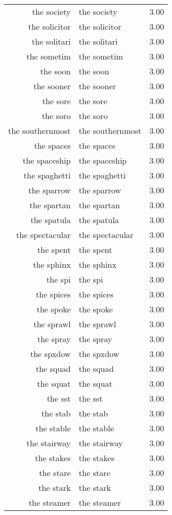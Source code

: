 \begin{table}[ht]
\begin{tabular}{rlr}
  the society & the society & 3.00 \\ 
  the solicitor & the solicitor & 3.00 \\ 
  the solitari & the solitari & 3.00 \\ 
  the sometim & the sometim & 3.00 \\ 
  the soon & the soon & 3.00 \\ 
  the sooner & the sooner & 3.00 \\ 
  the sore & the sore & 3.00 \\ 
  the soro & the soro & 3.00 \\ 
  the southernmost & the southernmost & 3.00 \\ 
  the spaces & the spaces & 3.00 \\ 
  the spaceship & the spaceship & 3.00 \\ 
  the spaghetti & the spaghetti & 3.00 \\ 
  the sparrow & the sparrow & 3.00 \\ 
  the spartan & the spartan & 3.00 \\ 
  the spatula & the spatula & 3.00 \\ 
  the spectacular & the spectacular & 3.00 \\ 
  the spent & the spent & 3.00 \\ 
  the sphinx & the sphinx & 3.00 \\ 
  the spi & the spi & 3.00 \\ 
  the spices & the spices & 3.00 \\ 
  the spoke & the spoke & 3.00 \\ 
  the sprawl & the sprawl & 3.00 \\ 
  the spray & the spray & 3.00 \\ 
  the spxdow & the spxdow & 3.00 \\ 
  the squad & the squad & 3.00 \\ 
  the squat & the squat & 3.00 \\ 
  the sst & the sst & 3.00 \\ 
  the stab & the stab & 3.00 \\ 
  the stable & the stable & 3.00 \\ 
  the stairway & the stairway & 3.00 \\ 
  the stakes & the stakes & 3.00 \\ 
  the stare & the stare & 3.00 \\ 
  the stark & the stark & 3.00 \\ 
  the steamer & the steamer & 3.00 \\ 

\end{tabular}
\end{table}
